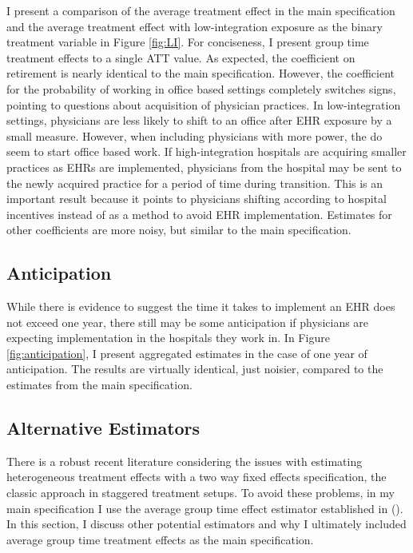 \documentclass[11pt]{article}
\begin{document}
I present a comparison of the average treatment effect in the main specification and the average treatment effect with low-integration exposure as the binary treatment variable in Figure \ref{fig:LI}. For conciseness, I present group time treatment effects to a single ATT value. As expected, the coefficient on retirement is nearly identical to the main specification. However, the coefficient for the probability of working in office based settings completely switches signs, pointing to questions about acquisition of physician practices. In low-integration settings, physicians are less likely to shift to an office after EHR exposure by a small measure. However, when including physicians with more power, the do seem to start office based work. If high-integration hospitals are acquiring smaller practices as EHRs are implemented, physicians from the hospital may be sent to the newly acquired practice for a period of time during transition. This is an important result because it points to physicians shifting according to hospital incentives instead of as a method to avoid EHR implementation. Estimates for other coefficients are more noisy, but similar to the main specification. 



\subsection{Anticipation}\label{app:anticipation}

While there is evidence to suggest the time it takes to implement an EHR does not exceed one year, there still may be some anticipation if physicians are expecting implementation in the hospitals they work in. In Figure \ref{fig:anticipation}, I present aggregated estimates in the case of one year of anticipation. The results are virtually identical, just noisier, compared to the estimates from the main specification. 

\subsection{Alternative Estimators}\label{app:estimators}

There is a robust recent literature considering the issues with estimating heterogeneous treatment effects with a two way fixed effects specification, the classic approach in staggered treatment setups. To avoid these problems, in my main specification I use the average group time effect estimator established in \citeauthor{callaway2021difference} (\citeyear{callaway2021difference}). In this section, I discuss other potential estimators and why I ultimately included average group time treatment effects as the main specification. 
\end{document}
